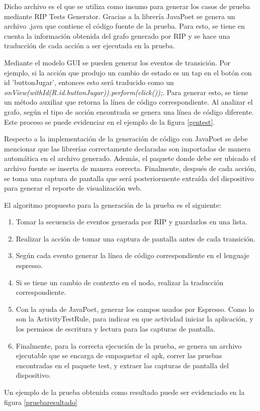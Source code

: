 Dicho archivo es el que se utiliza como insumo para generar los casos de prueba mediante RIP Tests Generator. Gracias a la librería JavaPoet \cite{JavaPoet} se genera un archivo .java que contiene el código fuente de la prueba. Para esto, se tiene en cuenta la información obtenida del grafo generado por RIP y se hace una traducción de cada acción a ser ejecutada en la prueba.

Mediante el modelo GUI se pueden generar los eventos de transición. Por ejemplo, si la acción que produjo un cambio de estado es un tap en el botón con id 'buttonJugar', entonces esto será traducido como un \textit{onView(withId(R.id.buttonJugar)).perform(click());}. Para generar esto, se tiene un método auxiliar que retorna la línea de código correspondiente. Al analizar el grafo, según el tipo de acción encontrada se genera una línea de código diferente. Este proceso se puede evidenciar en el ejemplo de la figura \ref{gentest}.

Respecto a la implementación de la generación de código con JavaPoet se debe mencionar que las librerías correctamente declaradas son importadas de manera automática en el archivo generado. Además, el paquete donde debe ser ubicado el archivo fuente se inserta de manera correcta. Finalmente, después de cada acción, se toma una captura de pantalla que será posteriormente extraída del dispositivo para generar el reporte de visualización web.

El algoritmo propuesto para la generación de la prueba es el siguiente:

\begin{enumerate}
	\item Tomar la secuencia de eventos generada por RIP y guardarlos en una lista.
	\item Realizar la acción de tomar una captura de pantalla antes de cada transición.
	\item Según cada evento generar la línea de código correspondiente en el lenguaje espresso.
	\item Si se tiene un cambio de contexto en el nodo, realizar la traducción correspondiente.
	\item Con la ayuda de JavaPoet, generar los campos usados por Espresso. Como lo son la ActivityTestRule, para indicar en que actividad iniciar la aplicación, y los permisos de escritura y lectura para las capturas de pantalla.
	\item Finalmente, para la correcta ejecución de la prueba, se genera un archivo ejecutable que se encarga de empaquetar el apk, correr las pruebas encontradas en el paquete test, y extraer las capturas de pantalla del dispositivo.
\end{enumerate}
Un ejemplo de la prueba obtenida como resultado puede ser evidenciado en la figura \ref{pruebaresultado}

